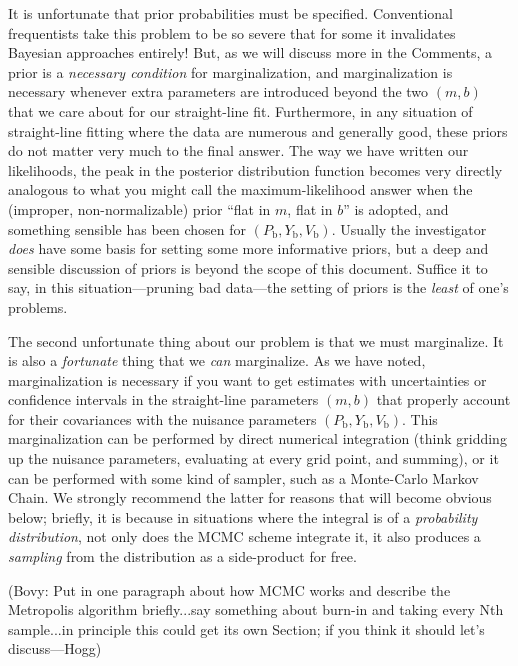 \documentclass[12pt,twoside]{article}
\newcommand{\documentname}{document}
\newcommand{\sectionname}{Section}
\newcommand{\commentsname}{Comments}
\newcounter{problem}
\newcommand{\Pbad}{P_{\mathrm{b}}}
\newcommand{\Ybad}{Y_{\mathrm{b}}}
\newcommand{\Vbad}{V_{\mathrm{b}}}
\begin{document}
It is unfortunate that prior probabilities must be specified.
Conventional frequentists take this problem to be so severe that for
some it invalidates Bayesian approaches entirely!  But, as we will
discuss more in the \commentsname, a prior is a \emph{necessary
  condition} for marginalization, and marginalization is necessary
whenever extra parameters are introduced beyond the two $(m,b)$ that
we care about for our straight-line fit.  Furthermore, in any
situation of straight-line fitting where the data are numerous and
generally good, these priors do not matter very much to the final
answer.  The way we have written our likelihoods, the peak in the
posterior distribution function becomes very directly analogous to
what you might call the maximum-likelihood answer when the (improper,
non-normalizable) prior ``flat in $m$, flat in $b$'' is adopted, and
something sensible has been chosen for $(\Pbad,\Ybad,\Vbad)$.  Usually
the investigator \emph{does} have some basis for setting some more
informative priors, but a deep and sensible discussion of priors is
beyond the scope of this \documentname.  Suffice it to say, in this
situation---pruning bad data---the setting of priors is the
\emph{least} of one's problems.

The second unfortunate thing about our problem is that we must
marginalize.  It is also a \emph{fortunate} thing that we \emph{can}
marginalize.  As we have noted, marginalization is necessary if you
want to get estimates with uncertainties or confidence intervals in
the straight-line parameters $(m,b)$ that properly account for their
covariances with the nuisance parameters $(\Pbad,\Ybad,\Vbad)$.  This
marginalization can be performed by direct numerical integration
(think gridding up the nuisance parameters, evaluating at every grid
point, and summing), or it can be performed with some kind of sampler,
such as a Monte-Carlo Markov Chain.  We strongly recommend the latter
for reasons that will become obvious below; briefly, it is because in
situations where the integral is of a \emph{probability distribution},
not only does the MCMC scheme integrate it, it also produces a
\emph{sampling} from the distribution as a side-product for free.

(Bovy: Put in one paragraph about how MCMC works and describe the
Metropolis algorithm briefly...say something about burn-in and taking
every Nth sample...in principle this could get its own \sectionname;
if you think it should let's discuss---Hogg)
\end{document}
